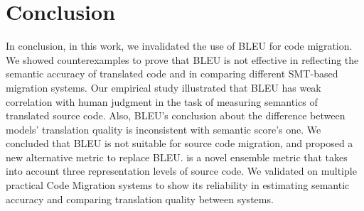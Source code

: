 \section{Conclusion}
In conclusion, in this work, we invalidated the use of BLEU for code migration. We showed counterexamples to prove that BLEU is not effective in reflecting the semantic accuracy of translated code and in comparing different SMT-based migration systems. Our empirical study illustrated that BLEU has weak correlation with human judgment in the task of measuring semantics of translated source code. Also, BLEU's conclusion about the difference between models' translation quality is inconsistent with semantic score's one. We concluded that BLEU is not suitable for source code migration, and proposed a new alternative metric {\model} to replace BLEU. {\model} is a novel ensemble metric that takes into account three representation levels of source code. We validated {\model} on multiple practical Code Migration systems to show its reliability in estimating semantic accuracy and comparing translation quality between systems. 